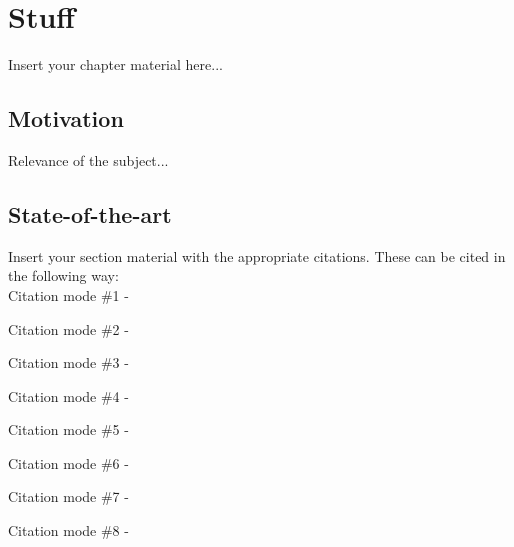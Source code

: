 
\chapter{Stuff}
\label{chapter:introduction}

Insert your chapter material here...

\section{Motivation}
\label{section:motivation}

Relevance of the subject...


\section{State-of-the-art}
\label{section:state}

Insert your section material with the appropriate citations.
These can be cited in the following way: \\

Citation mode \#1 - \quad \cite{jameson:adjointns}

Citation mode \#2 - \quad \citet{jameson:adjointns}

Citation mode \#3 - \quad \citep{jameson:adjointns}


Citation mode \#4 - \quad \citet*{jameson:adjointns}

Citation mode \#5 - \quad \citep*{jameson:adjointns}


Citation mode \#6 - \quad \citealt{jameson:adjointns}

Citation mode \#7 - \quad \citealp{jameson:adjointns}


Citation mode \#8 - \quad \citeauthor{jameson:adjointns}

